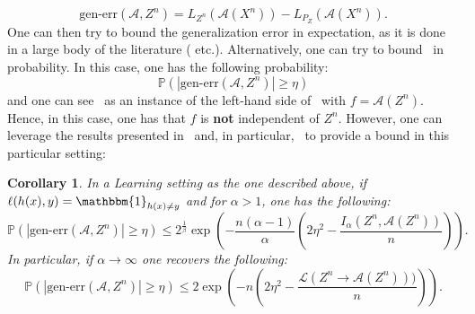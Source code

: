 \documentclass{article}
\numberwithin{theorem}{section}
\newtheorem{corollary}[theorem]{Corollary}
\numberwithin{example}{section}
\numberwithin{remark}{section}
\numberwithin{definition}{section}
\newcommand{\ml}[2]{\mathcal{L}\left(#1  \!\!  \to  \!\!   #2\right)} %
\begin{document}
\begin{equation}
    \text{gen-err}(\mathcal{A},Z^n) = L_{Z^n}(\mathcal{A}(X^n))- L_{P_Z}(\mathcal{A}(X^n)). \label{eq:genErr}
\end{equation}
One can then try to bound the generalization error in expectation, as it is done in a large body of the literature (\cite{shalevShwartzBD:14,XuR:17,Yeung:09} etc.). Alternatively, one can try to bound~ in probability. In this case, one has the following probability:
\begin{equation}
    \mathbb{P}(|\text{gen-err}(\mathcal{A},Z^n)|\geq \eta) \label{eq:concentrationDependence}
\end{equation} 
and one can see~ as an instance of the left-hand side of~ with $f=\mathcal{A}(Z^n)$. Hence, in this case, one has that $f$ is \textbf{not} independent of $Z^n$. However, one can leverage the results presented in~ and, in particular,~ to provide a bound in this particular setting:
\begin{corollary}\label{thm:genErrBound}
    In a Learning setting as the one described above, if $\ell(h(x),y)=\mathbbm{1}_{h(x)\neq y}$ and for $\alpha>1$, one has the following:
    \begin{equation}
        \mathbb{P}(|\text{gen-err}(\mathcal{A},Z^n)|\geq \eta) \leq 2^\frac1\beta \exp\left(-\frac{n(\alpha-1)}{\alpha}\left(2\eta^2 - \frac{I_\alpha(Z^n,\mathcal{A}(Z^n))}{n}\right)\right).\label{eq:genErrSibs}
    \end{equation}
    In particular, if $\alpha\to\infty$ one recovers the following:
     \begin{equation}
    \mathbb{P}(|\text{gen-err}(\mathcal{A},Z^n)|\geq \eta) \leq  2 \exp\left(-n\left(2\eta^2 - \frac{\ml{Z^n}{\mathcal{A}(Z^n)})}{n}\right)\right).\label{eq:genErrML}
    \end{equation}
\end{corollary}
\end{document}
